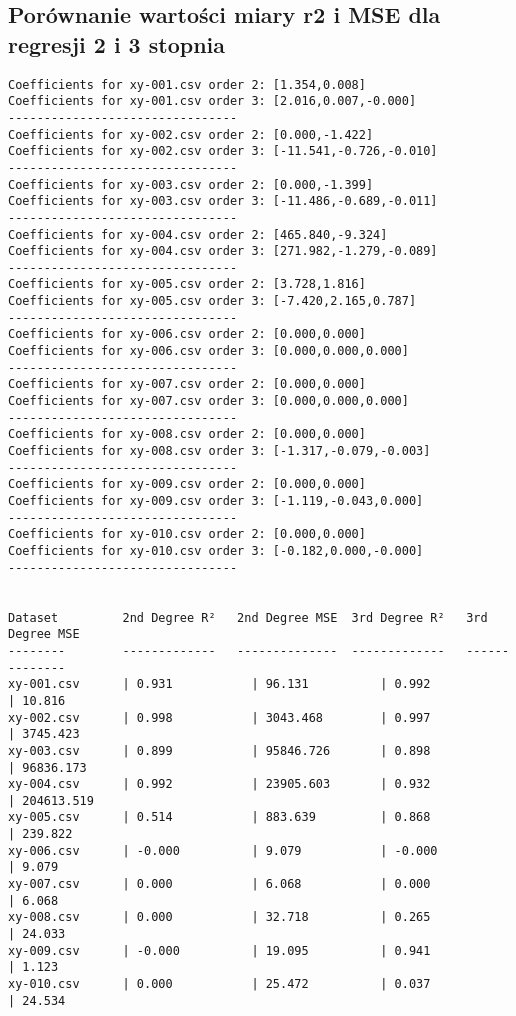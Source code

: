 \documentclass{article}
\begin{document}
\subsection{Porównanie wartości miary r2 i MSE dla regresji 2 i 3 stopnia}

\begin{verbatim}
Coefficients for xy-001.csv order 2: [1.354,0.008]
Coefficients for xy-001.csv order 3: [2.016,0.007,-0.000]
--------------------------------
Coefficients for xy-002.csv order 2: [0.000,-1.422]
Coefficients for xy-002.csv order 3: [-11.541,-0.726,-0.010]
--------------------------------
Coefficients for xy-003.csv order 2: [0.000,-1.399]
Coefficients for xy-003.csv order 3: [-11.486,-0.689,-0.011]
--------------------------------
Coefficients for xy-004.csv order 2: [465.840,-9.324]
Coefficients for xy-004.csv order 3: [271.982,-1.279,-0.089]
--------------------------------
Coefficients for xy-005.csv order 2: [3.728,1.816]
Coefficients for xy-005.csv order 3: [-7.420,2.165,0.787]
--------------------------------
Coefficients for xy-006.csv order 2: [0.000,0.000]
Coefficients for xy-006.csv order 3: [0.000,0.000,0.000]
--------------------------------
Coefficients for xy-007.csv order 2: [0.000,0.000]
Coefficients for xy-007.csv order 3: [0.000,0.000,0.000]
--------------------------------
Coefficients for xy-008.csv order 2: [0.000,0.000]
Coefficients for xy-008.csv order 3: [-1.317,-0.079,-0.003]
--------------------------------
Coefficients for xy-009.csv order 2: [0.000,0.000]
Coefficients for xy-009.csv order 3: [-1.119,-0.043,0.000]
--------------------------------
Coefficients for xy-010.csv order 2: [0.000,0.000]
Coefficients for xy-010.csv order 3: [-0.182,0.000,-0.000]
--------------------------------


Dataset         2nd Degree R²   2nd Degree MSE  3rd Degree R²   3rd Degree MSE
--------        -------------   --------------  -------------   --------------
xy-001.csv      | 0.931           | 96.131          | 0.992           | 10.816          
xy-002.csv      | 0.998           | 3043.468        | 0.997           | 3745.423        
xy-003.csv      | 0.899           | 95846.726       | 0.898           | 96836.173       
xy-004.csv      | 0.992           | 23905.603       | 0.932           | 204613.519      
xy-005.csv      | 0.514           | 883.639         | 0.868           | 239.822         
xy-006.csv      | -0.000          | 9.079           | -0.000          | 9.079           
xy-007.csv      | 0.000           | 6.068           | 0.000           | 6.068           
xy-008.csv      | 0.000           | 32.718          | 0.265           | 24.033          
xy-009.csv      | -0.000          | 19.095          | 0.941           | 1.123           
xy-010.csv      | 0.000           | 25.472          | 0.037           | 24.534              
\end{verbatim}
\end{document}
